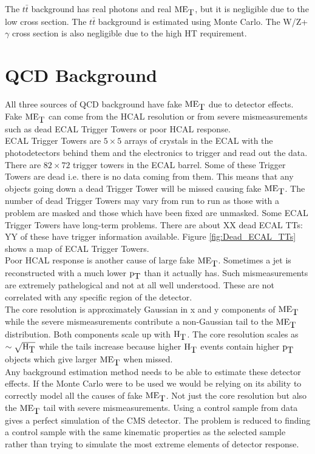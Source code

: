 The $t\bar{t}$ background has real photons and real $\mbox{ME}_{\mbox{T}}$, but it is negligible 
due to the low cross section. The $t\bar{t}$ background is estimated using Monte
Carlo. The W/Z+$\gamma$ cross section is also negligible due to the high HT
requirement.

\section{QCD Background}
\label{sec:QCD_Background}

All three sources of QCD background have fake $\mbox{ME}_{\mbox{T}}$ due to detector effects.
Fake $\mbox{ME}_{\mbox{T}}$ can come from the HCAL resolution or from severe mismeasurements
such as dead ECAL Trigger Towers or poor HCAL response. \\

ECAL Trigger Towers are $5\times5$ arrays of crystals in the ECAL with the
photodetectors behind them and the electronics to trigger and read out the data. 
There are $82\times72$ trigger towers in the ECAL barrel. Some of these Trigger
Towers are dead i.e. there is no data coming from them. This means that any
objects going down a dead Trigger Tower will be missed causing fake $\mbox{ME}_{\mbox{T}}$. The 
number of dead Trigger Towers may vary from run to run as those with a problem 
are masked and those which have been fixed are unmasked. Some ECAL Trigger 
Towers have long-term problems. There are about XX dead ECAL TTs: YY of these 
have trigger information available. Figure \ref{fig:Dead_ECAL_TTs} shows a map 
of ECAL Trigger Towers. \\

Poor HCAL response is another cause of large fake $\mbox{ME}_{\mbox{T}}$. Sometimes a jet is
reconstructed with a much lower $\mbox{p}_{\mbox{T}}$ than it actually has. Such mismeasurements
are extremely pathelogical and not at all well understood. These are not
correlated with any specific region of the detector. \\

The core resolution is approximately Gaussian in x and y components of $\mbox{ME}_{\mbox{T}}$ 
while the severe mismeasurements contribute a non-Gaussian tail to the $\mbox{ME}_{\mbox{T}}$ 
distribution. Both components scale up with $\mbox{H}_{\mbox{T}}$. The core resolution scales as
$\sim\sqrt{\mbox{H}_{\mbox{T}}}$ while the tails increase because higher $\mbox{H}_{\mbox{T}}$ events contain 
higher $\mbox{p}_{\mbox{T}}$ objects which give larger $\mbox{ME}_{\mbox{T}}$ when missed. \\

Any background estimation method needs to be able to estimate these detector 
effects. If the Monte Carlo were to be used we would be relying on its ability 
to correctly model all the causes of fake $\mbox{ME}_{\mbox{T}}$. Not just the core resolution 
but also the $\mbox{ME}_{\mbox{T}}$ tail with severe mismeasurements. Using a control sample 
from data gives a perfect simulation of the CMS detector. The problem is reduced
to finding a control sample with the same kinematic properties as the selected 
sample rather than trying to simulate the most extreme elements of detector
response. \\

